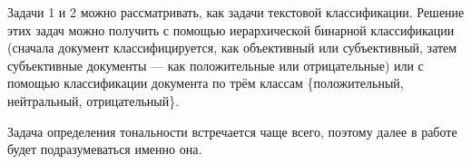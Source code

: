Задачи 1 и 2 можно рассматривать, как задачи текстовой классификации. Решение этих задач можно получить с помощью иерархической бинарной классификации (сначала документ классифицируется, как объективный или субъективный, затем субъективные документы --- как положительные или отрицательные) или с помощью классификации документа по трём классам \{положительный, нейтральный, отрицательный\}. 

Задача определения тональности встречается чаще всего, поэтому далее в работе будет подразумеваться именно она.